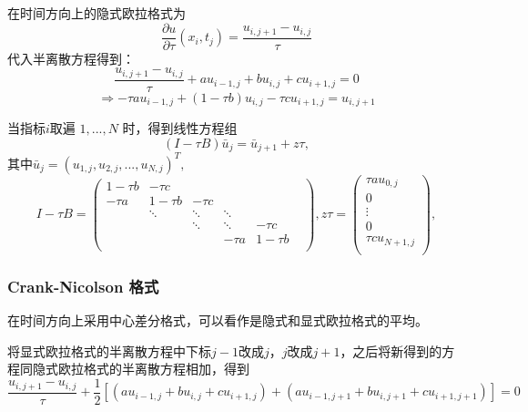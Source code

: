 \documentclass{article}
\begin{document}
在时间方向上的隐式欧拉格式为$$\frac{\partial u}{\partial \tau}(x_i, t_j) = \frac{u_{i, j+1} - u_{i, j}}{\tau}$$
代入半离散方程得到：$$\frac{u_{i, j+1} - u_{i, j}}{\tau} + au_{i-1, j} + bu_{i, j} + cu_{i+1, j} = 0$$
$$\Rightarrow -\tau au_{i-1, j} + (1 - \tau b)u_{i, j} - \tau cu_{i+1, j} = u_{i, j+1}$$

当指标$i$取遍 $1,...,N$ 时，得到线性方程组$$(I - \tau B)\bar{u}_{j} = \bar{u}_{j+1} + z\tau,$$
其中$\bar{u}_{j} = (u_{1, j}, u_{2, j},...,u_{N, j})^T,$
$$
I - \tau B = \begin{pmatrix}
                1 -\tau b  &   -\tau c    &            &            &            & \\
                -\tau a    &   1 -\tau b  &   -\tau c  &            &            & \\
                           &   \ddots     &   \ddots   &   \ddots   &            & \\
                           &              &   \ddots   &   \ddots   &  -\tau c   & \\
                           &              &            &   -\tau a  &  1 -\tau b & \\
            \end{pmatrix},
z\tau = \begin{pmatrix}
            \tau au_{0, j}   \\
            0                \\
            \vdots           \\
            0                \\
            \tau cu_{N+1, j} \\
        \end{pmatrix},
$$


\subsubsection{Crank-Nicolson 格式}

在时间方向上采用中心差分格式，可以看作是隐式和显式欧拉格式的平均。

将显式欧拉格式的半离散方程中下标$j-1$改成$j$，$j$改成$j+1$，之后将新得到的方程同隐式欧拉格式的半离散方程相加，得到
$$\frac{u_{i, j+1} - u_{i, j}}{\tau} + \frac{1}{2}[(au_{i-1, j} + bu_{i, j} + cu_{i+1, j}) + (au_{i-1, j+1} + bu_{i, j+1} + cu_{i+1, j+1})] = 0$$
\end{document}
